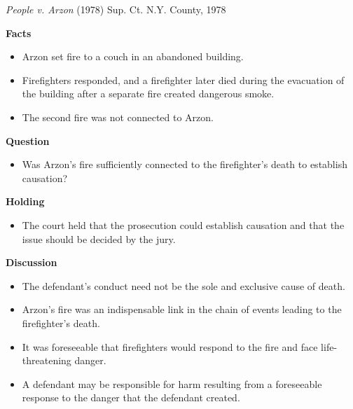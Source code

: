 \documentclass[11pt]{tex/lawoutline}
\begin{document}
\casebox
{\textit{People v. Arzon} (1978)}
{Sup. Ct. N.Y. County, 1978}
{
\textbf{Facts}
\begin{itemize}
    \item Arzon set fire to a couch in an abandoned building.
    \item Firefighters responded, and a firefighter later died during the evacuation of the building after a separate fire created dangerous smoke.
    \item The second fire was not connected to Arzon.
\end{itemize}

\textbf{Question}
\begin{itemize}
    \item Was Arzon's fire sufficiently connected to the firefighter's death to establish causation?
\end{itemize}

\textbf{Holding}
\begin{itemize}
    \item The court held that the prosecution could establish causation and that the issue should be decided by the jury.
\end{itemize}

\textbf{Discussion}
\begin{itemize}
    \item The defendant's conduct need not be the sole and exclusive cause of death.
    \item Arzon's fire was an indispensable link in the chain of events leading to the firefighter's death.
    \item It was foreseeable that firefighters would respond to the fire and face life-threatening danger.
    \item A defendant may be responsible for harm resulting from a foreseeable response to the danger that the defendant created.
\end{itemize}
}

\end{document}
